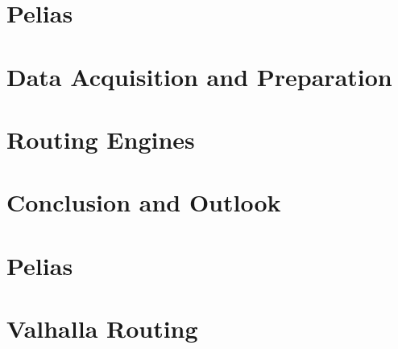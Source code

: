 \documentclass[12pt]{report}
\renewcommand{\listfigurename}{\begingroup
    \tocchapter{}
    \tocfile{\listoffigurename}{B Illustration Directory}
\endgroup}
\begin{document}
\chapter{Pelias}


\chapter{Data Acquisition and Preparation}

\chapter{Routing Engines}


\chapter{Conclusion and Outlook}


\newpage


\renewcommand{\listfigurename}{B Illustration Directory}
\listoffigures
\listoftables

\begin{appendices}
  \chapter{Pelias}
  
  \chapter{Valhalla Routing}
  
\end{appendices}
\end{document}
